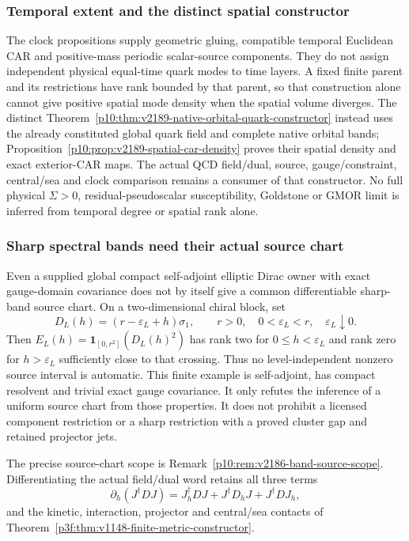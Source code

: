 \documentclass[12pt,a4paper]{article}
\begin{document}
\subsubsection{Temporal extent and the distinct spatial constructor}
The clock propositions supply geometric gluing, compatible temporal
Euclidean CAR and positive-mass periodic scalar-source components. They do
not assign independent physical equal-time quark modes to time layers.
A fixed finite parent and its restrictions have rank bounded by that parent,
so that construction alone cannot give positive spatial mode density when
the spatial volume diverges. The distinct
Theorem~\ref{p10:thm:v2189-native-orbital-quark-constructor} instead uses
the already constituted global quark field and complete native orbital
bands; Proposition~\ref{p10:prop:v2189-spatial-car-density} proves their
spatial density and exact exterior-CAR maps.
The actual QCD field/dual, source, gauge/constraint, central/sea and clock
comparison remains a consumer of that constructor. No full physical
$\Sigma>0$, residual-pseudoscalar susceptibility, Goldstone or GMOR limit
is inferred from temporal degree or spatial rank alone.


\subsubsection{Sharp spectral bands need their actual source chart}
Even a supplied global compact self-adjoint elliptic Dirac owner with exact
gauge-domain covariance does not by itself give a common differentiable
sharp-band source chart. On a two-dimensional chiral block, set
\[
 D_L(h)=(r-\varepsilon_L+h)\sigma_1,
 \qquad r>0,\quad 0<\varepsilon_L<r,\quad\varepsilon_L\downarrow0.
\]
Then $E_L(h)=\mathbf1_{[0,r^2]}(D_L(h)^2)$ has rank two for
$0\le h<\varepsilon_L$ and rank zero for $h>\varepsilon_L$ sufficiently
close to that crossing. Thus no level-independent nonzero source interval
is automatic. This finite example is self-adjoint, has compact resolvent
and trivial exact gauge covariance. It only refutes the inference of a
uniform source chart from those properties.
It does not prohibit a licensed component restriction or a sharp
restriction with a proved cluster gap and retained projector jets.

The precise source-chart scope is
Remark~\ref{p10:rem:v2186-band-source-scope}.
Differentiating the actual field/dual word retains all three terms
\[
 \partial_h(J^\dagger D J)
 =J_h^\dagger DJ+J^\dagger D_hJ+J^\dagger DJ_h,
\]
and the kinetic, interaction, projector and central/sea contacts of
Theorem~\ref{p3f:thm:v1148-finite-metric-constructor}.
\end{document}

